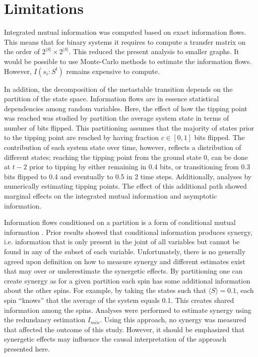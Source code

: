 \documentclass[a4paper, 11pt, twocolumn]{article}
\begin{document}
\section{Limitations}
\label{sec:org26f073f}
Integrated mutual  information was  computed based  on exact
information  flows. This  means that  for binary  systems it
requires  to  compute a  transfer  matrix  on the  order  of
\(2^{|S|} \times 2^{|S|}\). This  reduced the present analysis to
smaller  graphs. It  would  be possible  to use  Monte-Carlo
methods   to  estimate   the  information   flows.  However,
\(I(s_i : S^t)\) remains expensive to compute.

In addition, the decomposition  of the metastable transition
depends  on the  partition of  the state  space. Information
flows are  in essence statistical dependencies  among random
variables. Here,  the effect  of how  the tipping  point was
reached was studied by partition the average system state in
terms of  number of bits flipped.  This partitioning assumes
that the majority  of states prior to the  tipping point are
reached by having fraction \(c  \in [0, 1]\) bits flipped. The
contribution  of  each  system  state  over  time,  however,
reflects a  distribution of  different states;  reaching the
tipping  point from  the  ground  state 0,  can  be done  at
\(t-2\) prior to tipping by either remaining in 0.4 bits, or
transitioning from 0.3 bits flipped to 0.4 and eventually to
0.5 in  2 time steps. Additionally,  analyses by numerically
estimating  tipping points.  The effect  of this  additional
path  showed  marginal  effects  on  the  integrated  mutual
information and asymptotic information.

Information flows  conditioned on a  partition is a  form of
conditional   mutual   information  \cite{James2016a}.   Prior
results   showed  that   conditional  information   produces
synergy, i.e. information that is  only present in the joint
of all variables but cannot be found in any of the subset of
each variable.  Unfortunately, there is no  generally agreed
upon    definition    on     how    to    measure    synergy
\cite{Beer2015,Kolchinsky2022}  and different  estimates exist
that may  over or  underestimate the synergetic  effects. By
partitioning one can create synergy as for a given partition
each spin  has some  additional information about  the other
spins. For example, by taking the states such that \(\langle S \rangle =
0.1\),  each spin  ``knows'' that  the average  of the  system
equals 0.1. This creates shared information among the spins.
Analyses  were  performed  to  estimate  synergy  using  the
redundancy  estimation  \(I_{min}\)\cite{Williams2010}.  Using
this  approach, no  synergy was  measured that  affected the
outcome of this study. However, it should be emphasized that
synergetic effects  may influence the  causal interpretation
of the approach presented here.
\end{document}
